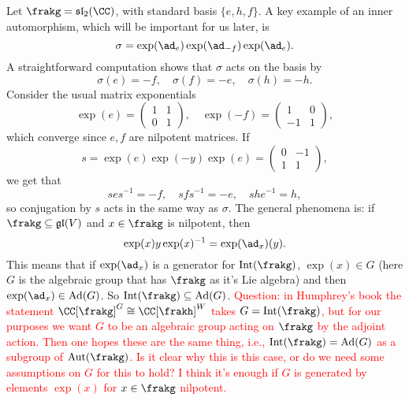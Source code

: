 \begin{example}
Let $\frakg = \mathfrak{sl}_2(\CC)$, with standard basis $\{e, h, f\}$.
A key example of an inner automorphism, which will be important for us later, is
$$\sigma = \exp(\ad_e)\exp(\ad_{-f})\exp(\ad_e).$$
A straightforward computation shows that $\sigma$ acts on the basis by
$$\sigma(e) = -f, \quad \sigma(f) = -e, \quad \sigma(h) = -h.$$
Consider the usual matrix exponentials 
$$\exp(e) = 
\begin{pmatrix}
	1 & 1 \\
	0 & 1 
\end{pmatrix},
\quad
\exp(-f) =
\begin{pmatrix}
	1 & 0 \\
	-1 & 1
\end{pmatrix},$$
which converge since $e, f$ are nilpotent matrices.
If
$$s = \exp(e) \exp(-y) \exp(e) =
\begin{pmatrix}
	0 & -1 \\
	1 & 1
\end{pmatrix},$$
we get that
$$s e s^{-1} = -f, \quad s f s^{-1} = -e, \quad s h e^{-1}=h,$$
so conjugation by $s$ acts in the same way as $\sigma$.
The general phenomena is:
if $\frakg \subseteq \mathfrak{gl}(V)$ and $x \in \frakg$ is nilpotent, then
$$\exp(x) y \exp(x)^{-1} = \exp(\ad_x)(y).$$
This means that if $\exp(\ad_x)$ is a generator for $\mathrm{Int}(\frakg)$, $\exp(x) \in G$ (here $G$ is the algebraic group that has $\frakg$ as it's Lie algebra) and then $\exp(\ad_x) \in \mathrm{Ad}(G)$.
So $\mathrm{Int}(\frakg) \subseteq \mathrm{Ad}(G)$.
\textcolor{red}{Question: in Humphrey's book the statement $\CC[\frakg]^G \cong \CC[\frakh]^W$ takes $G = \mathrm{Int}(\frakg)$, but for our purposes we want $G$ to be an algebraic group acting on $\frakg$ by the adjoint action.
Then one hopes these are the same thing, i.e., $\mathrm{Int}(\frakg) = \mathrm{Ad}(G)$ as a subgroup of $\mathrm{Aut}(\frakg)$.
Is it clear why this is this case, or do we need some assumptions on $G$ for this to hold? 
I think it's enough if $G$ is generated by elements $\exp(x)$ for $x \in \frakg$ nilpotent.}
\end{example}

